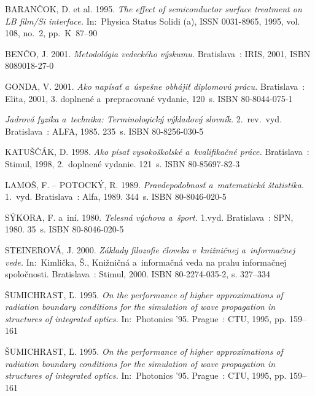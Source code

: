 \begin{thebibliography}{19}

BARANČOK, D. et al. 1995. \emph{The effect of semiconductor surface
treatment on LB film/Si interface.} In:~Physica Status Solidi (a), 
ISSN 0031-8965, 1995, vol. 108, no.~2, \mbox{pp. K~87--90}

BENČO, J. 2001. \emph{Metodológia vedeckého výskumu.} Bratislava~:
IRIS, 2001, ISBN 80\discretionary{-}{-}{-}89018-27-0

GONDA, V. 2001. \emph{Ako napísať a~úspešne obhájiť diplomovú prácu.}
Bratislava~: Elita, 2001, 3. doplnené a~prepracované vydanie, 120~s.
ISBN 80-8044-075-1

\emph{Jadrová fyzika a~technika: Terminologický výkladový slovník.}
2.~rev.~vyd. Bratislava~: ALFA, 1985. 235~s. ISBN 80-8256-030-5

KATUŠČÁK, D. 1998. \emph{Ako písať vysokoškolské a~kvalifikačné
práce.} Bratislava~: Stimul, 1998, 2.~doplnené vydanie. 121~s. ISBN
80-85697-82-3

LAMOŠ, F. -- POTOCKÝ, R. 1989. \emph{Pravdepodobnosť a~matematická
štatistika.} 1.~vyd. Bratislava~: Alfa, 1989. 344~s. ISBN 80-8046-020-5

SÝKORA, F. a~iní. 1980. \emph{Telesná výchova a~šport.} 1.vyd.
Bratislava~: SPN, 1980. 35~s. ISBN 80-8046-020-5

STEINEROVÁ, J. 2000. \emph{Základy filozofie človeka v~knižničnej
a~informačnej vede.} In:~Kimlička, Š., Knižničná a~informačná veda na
prahu informačnej spoločnosti. Bratislava~: Stimul, 2000. ISBN
80-2274-035-2, s. 327--334

ŠUMICHRAST, Ľ. 1995. \emph{On the performance of higher approximations
of radiation boundary conditions for the simulation of wave propagation
in structures of integrated optics.} In:~Photonics '95. Prague~: CTU,
1995, pp. 159--161

ŠUMICHRAST, Ľ. 1995. \emph{On the performance of higher approximations
	of radiation boundary conditions for the simulation of wave propagation
	in structures of integrated optics.} In:~Photonics '95. Prague~: CTU,
1995, pp. 159--161

\end{thebibliography}